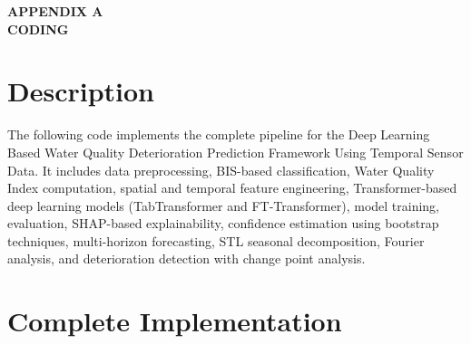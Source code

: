 \documentclass[12pt,a4paper]{report}
\numberwithin{table}{chapter}
\numberwithin{figure}{chapter}
\begin{document}
\appendix

\newpage
{}
\label{app:coding}
\begin{center}
  {\fontsize{16}{20}\selectfont\bfseries APPENDIX A\\[0.2cm]CODING}
\end{center}
\vspace{0.4cm}





\section{Description}

The following code implements the complete pipeline for the Deep Learning Based Water Quality Deterioration Prediction Framework Using Temporal Sensor Data. It includes data preprocessing, BIS-based classification, Water Quality Index computation, spatial and temporal feature engineering, Transformer-based deep learning models (TabTransformer and FT-Transformer), model training, evaluation, SHAP-based explainability, confidence estimation using bootstrap techniques, multi-horizon forecasting, STL seasonal decomposition, Fourier analysis, and deterioration detection with change point analysis.

\section{Complete Implementation}
\end{document}
